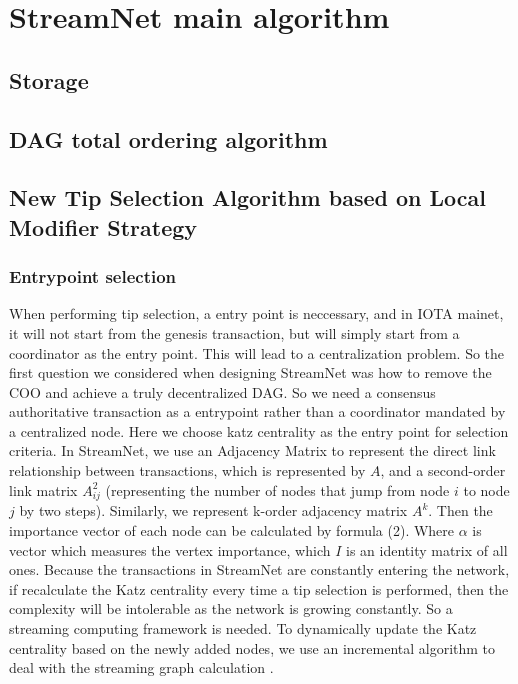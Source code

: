 \section{StreamNet main algorithm}

\subsection{Storage}

\subsection{DAG total ordering algorithm}

\subsection{New Tip Selection Algorithm based on Local Modifier Strategy}
\subsubsection{Entrypoint selection}
When performing tip selection, a entry point is neccessary, and in IOTA mainet, it will not start from the genesis transaction, 
but will simply start from a coordinator as the entry point.
This will lead to a centralization problem. 
So the first question we considered when designing StreamNet was how to remove the COO and achieve a truly decentralized DAG. 
So we need a consensus authoritative transaction as a entrypoint rather than a coordinator mandated by a centralized node.
Here we choose katz centrality \cite{katz1953new} as the entry point for selection criteria. 
In StreamNet, we use an Adjacency Matrix to represent the direct link relationship between transactions, which is represented by $A$,
and a second-order link matrix $A^2_{ij}$ (representing the number of nodes that jump from node $i$ to node $j$ by two steps).
Similarly, we represent k-order adjacency matrix $A^k$.
Then the importance vector of each node can be calculated by formula (2). 
Where $\alpha$ is vector which measures the vertex importance, which $I$ is an identity matrix of all ones.
Because the transactions in StreamNet are constantly entering the network, 
if recalculate the Katz centrality every time a tip selection is performed, 
then the complexity will be intolerable as the network is growing constantly. 
So a streaming computing framework is needed. 
To dynamically update the Katz centrality based on the newly added nodes, 
we use an incremental algorithm to deal with the streaming graph calculation \cite{nathan2018incrementally}.

